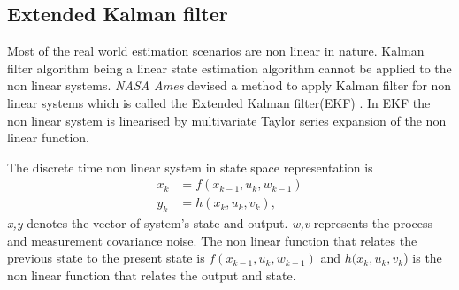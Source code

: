 \subsection{Extended Kalman filter}
Most of the real world estimation scenarios are non linear in nature. Kalman filter algorithm  being a linear state estimation algorithm cannot be applied to the non linear systems. \emph{NASA Ames} devised a method to apply Kalman filter for non linear systems which is called the Extended Kalman filter(EKF) \citep{ekf85}. In EKF the non linear system is linearised by multivariate Taylor series expansion of the non linear function. 

The discrete time non linear system in state space representation is
\begin{equation}
\label{eq:nl_disc}
\begin{split}
x_{k} &= f(x_{k-1},u_k,w_{k-1})\\
y_k &= h(x_k,u_k,v_k),
\end{split}
\end{equation}
\emph{x,y} denotes the vector of system's state and output. \emph{w,v} represents the process and measurement covariance noise. The non linear function that relates the previous state to the present state is  $f(x_{k-1},u_k,w_{k-1})$ and $h(x_k,u_k,v_k$) is the non linear function that relates the output and state. 

